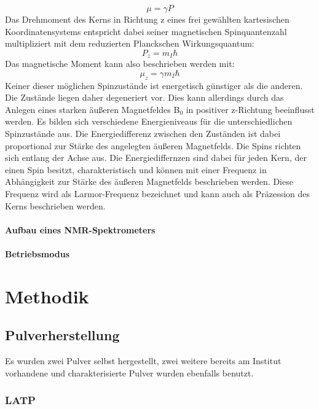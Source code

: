\documentclass[a4paper, 11pt, headsepline,footsepline,twoside,abstract]{scrbook}
\begin{document}
\begin{equation}
\mu = \gamma P
\end{equation}
Das Drehmoment des Kerns in Richtung z eines frei gewählten kartesischen Koordinatensystems entspricht dabei seiner magnetischen Spinquantenzahl multipliziert mit dem reduzierten Planckschen Wirkungsquantum:
\begin{equation}
P_z = m_I \hbar
\end{equation}
Das magnetische Moment kann also beschrieben werden mit:
\begin{equation}
\mu_z = \gamma m_I \hbar
\end{equation}
Keiner dieser möglichen Spinzustände ist energetisch günstiger als die anderen. Die Zustände liegen daher degeneriert vor. Dies kann allerdings durch das Anlegen eines starken äußeren Magnetfeldes B$_0$ in positiver z-Richtung beeinflusst werden. Es bilden sich verschiedene Energieniveaus für die unterschiedlichen Spinzustände aus. Die Energiedifferenz zwischen den Zuständen ist dabei proportional zur Stärke des angelegten äußeren Magnetfelds. Die Spins richten sich entlang der Achse aus. Die Energiediffernzen sind dabei für jeden Kern, der einen Spin besitzt, charakteristisch und können mit einer Frequenz in Abhängigkeit zur Stärke des äußeren Magnetfelds beschrieben werden. Diese Frequenz wird als Larmor-Frequenz bezeichnet und kann auch als Präzession des Kerns beschrieben werden.
\subsubsection{Aufbau eines NMR-Spektrometers}
\subsubsection{Betriebsmodus}
\chapter{Methodik}

\section{Pulverherstellung}
Es wurden zwei Pulver selbst hergestellt, zwei weitere bereits am Institut vorhandene und charakterisierte Pulver wurden ebenfalls benutzt.
\subsection{LATP}
\end{document}
